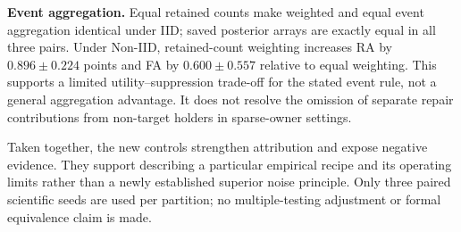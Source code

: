 \documentclass[software,article,submit,moreauthors]{Definitions/mdpi}
\begin{document}
\textbf{Event aggregation.} Equal retained counts make weighted and equal
event aggregation identical under IID; saved posterior arrays are exactly
equal in all three pairs. Under Non-IID, retained-count weighting increases
RA by $0.896\pm0.224$ points and FA by $0.600\pm0.557$ relative to equal
weighting. This supports a limited utility--suppression trade-off for the
stated event rule, not a general aggregation advantage. It does not resolve
the omission of separate repair contributions from non-target holders in
sparse-owner settings.

Taken together, the new controls strengthen attribution and expose negative
evidence. They support describing a particular empirical recipe and its
operating limits rather than a newly established superior noise principle.
Only three paired scientific seeds are used per partition; no multiple-testing
adjustment or formal equivalence claim is made.
\end{document}
